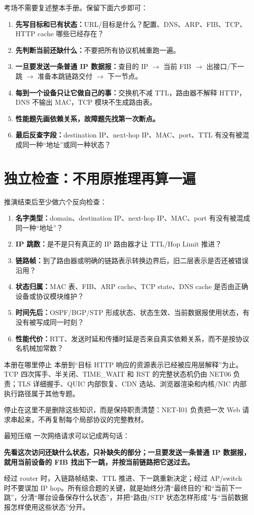 \documentclass[UTF8,fontset=none,11pt,a4paper]{ctexart}
\begin{document}
考场不需要复述整本手册。保留下面六步即可：

\begin{enumerate}
  \item \textbf{先写目标和已有状态：}URL/目标是什么？配置、DNS、ARP、FIB、TCP、HTTP cache 哪些已经存在？
  \item \textbf{先判断当前还缺什么：}不要把所有协议机械重跑一遍。
  \item \textbf{一旦要发送一条普通 IP 数据报：}查目的 IP $\to$ 当前 FIB $\to$ 出接口/下一跳 $\to$ 准备本跳链路交付 $\to$ 下一节点。
  \item \textbf{每到一个设备只让它做自己的事：}交换机不减 TTL，路由器不解释 HTTP，DNS 不输出 MAC，TCP 模块不生成路由表。
  \item \textbf{性能题先画依赖关系，故障题先找第一次断点。}
  \item \textbf{最后反查字段：}destination IP、next-hop IP、MAC、port、TTL 有没有被混成同一种“地址”或同一种状态？
\end{enumerate}

\section{独立检查：不用原推理再算一遍}

推演结束后至少做六个反向检查：

\begin{enumerate}
  \item \textbf{名字类型：}domain、destination IP、next-hop IP、MAC、port 有没有被混成同一种“地址”？
  \item \textbf{IP 跳数：}是不是只有真正的 IP 路由器才让 TTL/Hop Limit 推进？
  \item \textbf{链路帧：}到了路由器或明确的链路表示转换边界后，旧二层表示是否还被错误沿用？
  \item \textbf{状态归属：}MAC 表、FIB、ARP cache、TCP state、DNS cache 是否由正确设备或协议模块维护？
  \item \textbf{时间先后：}OSPF/BGP/STP 形成状态、状态生效、当前数据报使用状态，有没有被写成同一时刻？
  \item \textbf{性能代价：}RTT、发送时延和传播时延是否来自真实依赖关系，而不是按协议名机械加常数？
\end{enumerate}

\begin{boundarybox}{本册在哪里停止}
本册到“目标 HTTP 响应的资源表示已经被应用层解释”为止。TCP 四次挥手、半关闭、TIME\_WAIT 和 RST 的完整状态机仍由 NET06 负责；TLS 详细握手、QUIC 内部恢复、CDN 选站、浏览器渲染和内核/NIC 内部执行路径属于其他专题。

停止在这里不是删除这些知识，而是保持职责清楚：NET-I01 负责把一次 Web 请求串起来，不再复制每个局部协议的完整教材。
\end{boundarybox}

\begin{corebox}{最短压缩}
一次网络请求可以记成两句话：

\textbf{先看这次访问还缺什么状态，只补缺失的部分；一旦要发送一条普通 IP 数据报，就用当前设备的 FIB 找出下一跳，并按当前链路把它送过去。}

经过 router 时，入链路帧结束、TTL 推进、下一跳重新决定；经过 AP/switch 时不要误加 IP hop。所有综合题的关键，就是始终分清“最终目的”和“当前下一跳”，分清“哪台设备保存什么状态”，并把“路由/STP 状态怎样形成”与“当前数据报怎样使用这些状态”分开。
\end{corebox}
\end{document}
